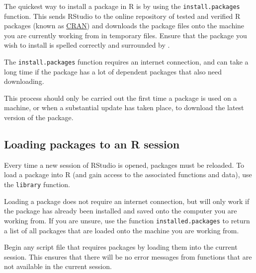 \documentclass[
  letterpaper,
  DIV=11,
  numbers=noendperiod]{scrreprt}
\begin{document}
The quickest way to install a package in R is by using the
\texttt{install.packages} function. This sends RStudio to the online
repository of tested and verified R packages (known as
\href{https://cran.r-project.org/}{CRAN}) and downloads the package
files onto the machine you are currently working from in temporary
files. Ensure that the package you wish to install is spelled correctly
and surrounded by \texttt{\textquotesingle{}\textquotesingle{}}.

\begin{tcolorbox}[enhanced jigsaw, bottomrule=.15mm, left=2mm, leftrule=.75mm, bottomtitle=1mm, coltitle=black, colbacktitle=quarto-callout-warning-color!10!white, toptitle=1mm, arc=.35mm, breakable, title=\textcolor{quarto-callout-warning-color}{\faExclamationTriangle}\hspace{0.5em}{Warning}, rightrule=.15mm, toprule=.15mm, opacityback=0, opacitybacktitle=0.6, titlerule=0mm, colback=white, colframe=quarto-callout-warning-color-frame]

The \texttt{install.packages} function requires an internet connection,
and can take a long time if the package has a lot of dependent packages
that also need downloading.

This process should only be carried out the first time a package is used
on a machine, or when a substantial update has taken place, to download
the latest version of the package.

\end{tcolorbox}

\subsection{Loading packages to an R
session}\label{loading-packages-to-an-r-session}

Every time a new session of RStudio is opened, packages must be
reloaded. To load a package into R (and gain access to the associated
functions and data), use the \texttt{library} function.

Loading a package does not require an internet connection, but will only
work if the package has already been installed and saved onto the
computer you are working from. If you are unsure, use the function
\texttt{installed.packages} to return a list of all packages that are
loaded onto the machine you are working from.

\begin{tcolorbox}[enhanced jigsaw, bottomrule=.15mm, left=2mm, leftrule=.75mm, bottomtitle=1mm, coltitle=black, colbacktitle=quarto-callout-tip-color!10!white, toptitle=1mm, arc=.35mm, breakable, title=\textcolor{quarto-callout-tip-color}{\faLightbulb}\hspace{0.5em}{Style tip}, rightrule=.15mm, toprule=.15mm, opacityback=0, opacitybacktitle=0.6, titlerule=0mm, colback=white, colframe=quarto-callout-tip-color-frame]

Begin any script file that requires packages by loading them into the
current session. This ensures that there will be no error messages from
functions that are not available in the current session.

\end{tcolorbox}
\end{document}
